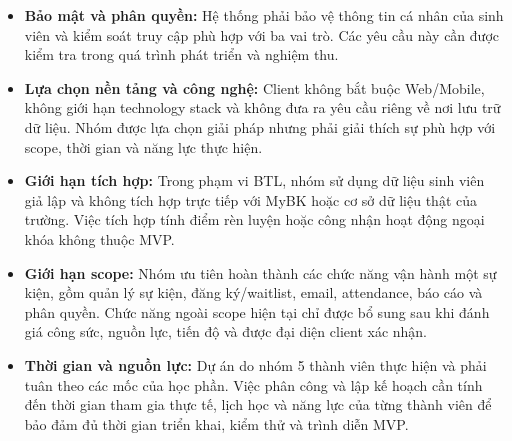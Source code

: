 \begin{itemize}
    \item \textbf{Bảo mật và phân quyền:} Hệ thống phải bảo vệ thông tin cá nhân của sinh viên và kiểm soát truy cập phù hợp với ba vai trò. Các yêu cầu này cần được kiểm tra trong quá trình phát triển và nghiệm thu.

    \item \textbf{Lựa chọn nền tảng và công nghệ:} Client không bắt buộc Web/Mobile, không giới hạn technology stack và không đưa ra yêu cầu riêng về nơi lưu trữ dữ liệu. Nhóm được lựa chọn giải pháp nhưng phải giải thích sự phù hợp với scope, thời gian và năng lực thực hiện.

    \item \textbf{Giới hạn tích hợp:} Trong phạm vi BTL, nhóm sử dụng dữ liệu sinh viên giả lập và không tích hợp trực tiếp với MyBK hoặc cơ sở dữ liệu thật của trường. Việc tích hợp tính điểm rèn luyện hoặc công nhận hoạt động ngoại khóa không thuộc MVP.

    \item \textbf{Giới hạn scope:} Nhóm ưu tiên hoàn thành các chức năng vận hành một sự kiện, gồm quản lý sự kiện, đăng ký/waitlist, email, attendance, báo cáo và phân quyền. Chức năng ngoài scope hiện tại chỉ được bổ sung sau khi đánh giá công sức, nguồn lực, tiến độ và được đại diện client xác nhận.

    \item \textbf{Thời gian và nguồn lực:} Dự án do nhóm 5 thành viên thực hiện và phải tuân theo các mốc của học phần. Việc phân công và lập kế hoạch cần tính đến thời gian tham gia thực tế, lịch học và năng lực của từng thành viên để bảo đảm đủ thời gian triển khai, kiểm thử và trình diễn MVP.
\end{itemize}